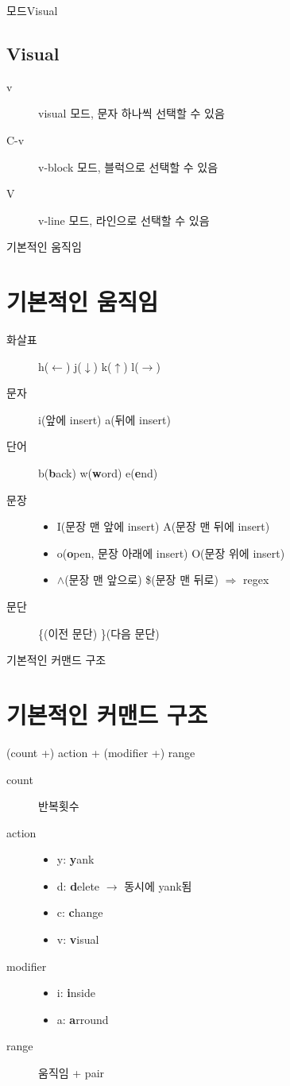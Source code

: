\documentclass[aspectratio=169]{beamer}
\newcommand{\ssframe}[1]{\begin{frame}[containsverbatim]{#1}\section{#1}}
\newcommand{\sssframe}[2]{\begin{frame}[containsverbatim]{#1}{#2}\subsection{#2}}
\begin{document}
\sssframe{모드}{Visual}
  \begin{description}
    \item[v] visual 모드, 문자 하나씩 선택할 수 있음
    \item[C-v] v-block 모드, 블럭으로 선택할 수 있음
    \item[V] v-line 모드, 라인으로 선택할 수 있음
  \end{description}
\end{frame}

\ssframe{기본적인 움직임}
  \begin{description}
    \item[화살표] h($\leftarrow$) j($\downarrow$) k($\uparrow$) l($\rightarrow$)
    \item[문자] i(앞에 insert) a(뒤에 insert)
    \item[단어] b(\textbf{b}ack) w(\textbf{w}ord) e(\textbf{e}nd)
    \item[문장]
      \begin{itemize}
        \item I(문장 맨 앞에 insert) A(문장 맨 뒤에 insert)
        \item o(\textbf{o}pen, 문장 아래에 insert) O(문장 위에 insert)
        \item $\wedge$(문장 맨 앞으로) \$(문장 맨 뒤로) $\Rightarrow$ regex
      \end{itemize}
    \item[문단] \{(이전 문단) \}(다음 문단)
  \end{description}
\end{frame}

\ssframe{기본적인 커맨드 구조}
  (count +) action + (modifier +) range

  \begin{description}
    \item[count] 반복횟수
    \item[action]
      \begin{itemize}
          \item y: \textbf{y}ank
          \item d: \textbf{d}elete $\rightarrow$ 동시에 yank됨
          \item c: \textbf{c}hange
          \item v: \textbf{v}isual
      \end{itemize}
    \item[modifier]
      \begin{itemize}
          \item i: \textbf{i}nside
          \item a: \textbf{a}rround
      \end{itemize}
    \item[range] 움직임 + pair
  \end{description}
\end{frame}
\end{document}
